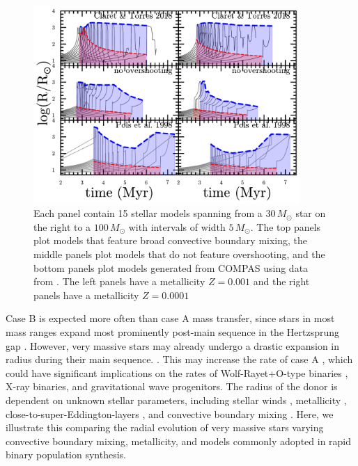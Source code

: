 \documentclass[twocolumn]{aastex63}
\begin{document}
\begin{figure}[htbp]
  \centering
  \includegraphics[width=0.9\textwidth]{radii}
  \caption{Each panel contain 15 stellar models spanning from a
    $30 \, M_{\odot}$ star on the right to a $100 \, M_{\odot}$ with
    intervals of width $5 \, M_{\odot}$. The top panels plot models
    that feature broad convective boundary mixing, the middle panels
    plot models that do not feature overshooting, and the bottom
    panels plot models generated from COMPAS using data from
    \cite{pols:98}. The left panels have a metallicity $Z=0.001$ and
    the right panels have a metallicity $Z=0.0001$}
  \label{fig:radii}
\end{figure}


Case B is expected more often than case A mass transfer, since stars
in most mass ranges expand most prominently post-main sequence in the
Hertzsprung gap \citep{vandenheuvel:69}. However, very massive stars
may already undergo a drastic expansion in radius during their main
sequence. \citep[e.g.,][]{sanyal:15, jiang:15, sabhahit:24}. This may
increase the rate of case A \citep{demink:08}, which could have
significant implications on the rates of Wolf-Rayet+O-type binaries
\citep[e.g.,][]{nuijten:24}, X-ray binaries, and gravitational wave
progenitors. The radius of the donor is dependent on unknown stellar
parameters, including stellar winds \citep{renzo:17, josiek:24},
metallicity \citep{xin:22}, close-to-super-Eddington-layers
\citep[e.g.,][]{joss:73, paxton:13, jiang: 15, agrawal:22}, and
convective boundary mixing \citep{anders:23, johnston:24}. Here, we
illustrate this comparing the radial evolution of very massive stars
varying convective boundary mixing, metallicity, and models commonly
adopted in rapid binary population synthesis.
\end{document}
